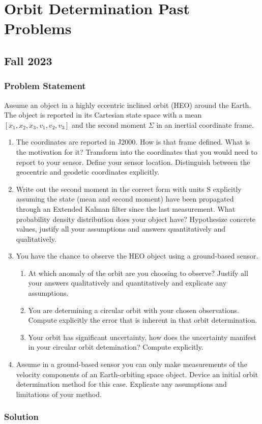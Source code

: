 \newcommand{\v}[1]{\mathbf{#1}}
\newcommand{\dv}[1]{\dot{\v{#1}}}
\newcommand{\ddv}[1]{\ddot{\v{#1}}}
\newcommand{\uv}[1]{\hat{\v{#1}}}


\maketitle

\section{Orbit Determination Past Problems}

\subsection{Fall 2023}

\subsubsection{Problem Statement}

Assume an object in a highly eccentric inclined orbit (HEO) around the Earth. The object is reported in its Cartesian state space with a mean $[x_1,x_2,x_3,v_1,v_2,v_3]$ and the second moment $\Sigma$ in an inertial coordinate frame.

\begin{enumerate}
    \item The coordinates are reported in J2000. How is that frame defined. What is the motivation for it? Transform into the coordinates that you would need to report to your sensor. Define your sensor location. Distinguish between the geocentric and geodetic coordinates explicitly.
    \item Write out the second moment in the correct form with units S explicitly assuming the state (mean and second moment) have been propagated through an Extended Kalman filter since the last measurement. What probability density distribution does your object have? Hypothesize concrete values, justify all your assumptions and answers quantitatively and qualitatively.
    \item You have the chance to observe the HEO object using a ground-based sensor.
    \begin{enumerate}
        \item At which anomaly of the orbit are you choosing to observe? Justify all your answers qualitatively and quantitatively and explicate any assumptions.
        \item You are determining a circular orbit with your chosen observations. Compute explicitly the error that is inherent in that orbit determination.
        \item Your orbit has significant uncertainty, how does the uncertainty manifest in your circular orbit detemination? Compute explicitly.
    \end{enumerate}
    \item Assume in a ground-based sensor you can only make measurements of the velocity components of an Earth-orbiting space object. Device an initial orbit determination method for this case. Explicate any assumptions and limitations of your method.
\end{enumerate}

\subsubsection{Solution}


